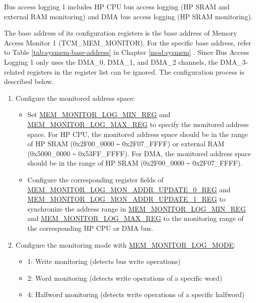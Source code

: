 \documentclass[main\_\_EN.tex]{subfiles}
\begin{document}
Bus access logging 1 includes HP CPU bus access logging (HP SRAM and external RAM monitoring) and DMA bus access logging (HP SRAM monitoring).

The base address of its configuration registers is the base address of Memory Access Monitor 1 (TCM\_MEM\_MONITOR). For the specific base address, refer to Table \ref{tab:sysmem-base-address} in Chapter \ref{mod:sysmem} \textit{}. Since Bus Access Logging 1 only uses the DMA\_0, DMA\_1, and DMA\_2 channels, the DMA\_3-related registers in the register list can be ignored. The configuration process is described below.

\begin{enumerate}
    \item Configure the monitored address space:
        \begin{itemize}
            \item Set \hyperref[regdesc:MEMMONITORLOGMINREG]{MEM\_MONITOR\_LOG\_MIN\_REG} and \hyperref[regdesc:MEMMONITORLOGMAXREG]{MEM\_MONITOR\_LOG\_MAX\_REG} to specify the monitored address space. For HP CPU, the monitored address space should be in the range of HP SRAM (0x2F00\_0000 \verb+~+ 0x2F07\_FFFF) or external RAM (0x5000\_0000 \verb+~+ 0x53FF\_FFFF). For DMA, the monitored address space should be in the range of HP SRAM (0x2F00\_0000 \verb+~+ 0x2F07\_FFFF).
            \item Configure the corresponding register fields of \hyperref[regdesc:MEMMONITORLOGMONADDRUPDATE0REG]{MEM\_MONITOR\_LOG\_MON\_ADDR\_UPDATE\_0\_REG} and \hyperref[regdesc:MEMMONITORLOGMONADDRUPDATE1REG]{MEM\_MONITOR\_LOG\_MON\_ADDR\_UPDATE\_1\_REG} to synchronize the address range in \hyperref[regdesc:MEMMONITORLOGMINREG]{MEM\_MONITOR\_LOG\_MIN\_REG} and \hyperref[regdesc:MEMMONITORLOGMAXREG]{MEM\_MONITOR\_LOG\_MAX\_REG} to the monitoring range of the corresponding HP CPU or DMA bus.
        \end{itemize}
    \item Configure the monitoring mode with \hyperref[fielddesc:MEMMONITORLOGMODE]{MEM\_MONITOR\_LOG\_MODE}:
        \begin{itemize}
            \item 1: Write monitoring (detects bus write operations)
            \item 2: Word monitoring (detects write operations of a specific word)
            \item 4: Halfword monitoring (detects write operations of a specific halfword)

\end{itemize}
\end{enumerate}
\end{document}
